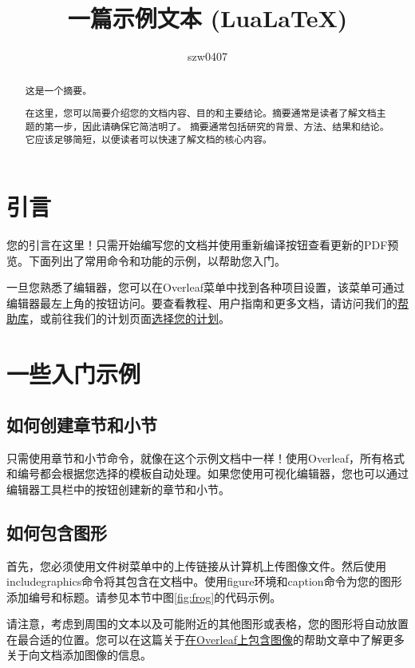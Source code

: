 \documentclass{article}
\title{一篇示例文本 (LuaLaTeX)}
\author{szw0407}
\begin{document}
\maketitle

\begin{abstract}
这是一个摘要。

在这里，您可以简要介绍您的文档内容、目的和主要结论。摘要通常是读者了解文档主题的第一步，因此请确保它简洁明了。
摘要通常包括研究的背景、方法、结果和结论。它应该足够简短，以便读者可以快速了解文档的核心内容。
\end{abstract}
\tableofcontents
\newpage
\section{引言}

您的引言在这里！只需开始编写您的文档并使用重新编译按钮查看更新的PDF预览。下面列出了常用命令和功能的示例，以帮助您入门。

一旦您熟悉了编辑器，您可以在Overleaf菜单中找到各种项目设置，该菜单可通过编辑器最左上角的按钮访问。要查看教程、用户指南和更多文档，请访问我们的\href{https://www.overleaf.com/learn}{帮助库}，或前往我们的计划页面\href{https://www.overleaf.com/user/subscription/plans}{选择您的计划}。

\section{一些入门示例}

\subsection{如何创建章节和小节}

只需使用章节和小节命令，就像在这个示例文档中一样！使用Overleaf，所有格式和编号都会根据您选择的模板自动处理。如果您使用可视化编辑器，您也可以通过编辑器工具栏中的按钮创建新的章节和小节。

\subsection{如何包含图形}

首先，您必须使用文件树菜单中的上传链接从计算机上传图像文件。然后使用includegraphics命令将其包含在文档中。使用figure环境和caption命令为您的图形添加编号和标题。请参见本节中图\ref{fig:frog}的代码示例。

请注意，考虑到周围的文本以及可能附近的其他图形或表格，您的图形将自动放置在最合适的位置。您可以在这篇关于\href{https://www.overleaf.com/learn/how-to/Including_images_on_Overleaf}{在Overleaf上包含图像}的帮助文章中了解更多关于向文档添加图像的信息。
\end{document}

